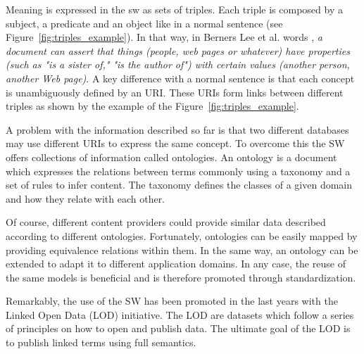 Meaning is expressed in the \acl{sw} as sets of triples.
Each triple is composed by a subject, a predicate and an object like in a normal sentence (see Figure~\ref{fig:triples_example}).
In that way, in Berners Lee et al. words \citep{berners-lee_semantic_2001}, \emph{a document can assert that things (people, web pages or whatever) have properties (such as "is a sister of," "is the author of") with certain values (another person, another Web page)}.
A key difference with a normal sentence is that each concept is unambiguously defined by an URI.
These URIs form links between different triples as shown by the example of the Figure~\ref{fig:triples_example}.




A problem with the information described so far is that two different databases may use different URIs to express the same concept.
To overcome this the SW offers collections of information called ontologies.
An ontology is a document which expresses the relations between terms commonly using a taxonomy and a set of rules to infer content.
The taxonomy defines the classes of a given domain and how they relate with each other.

Of course, different content providers could provide similar data described according to different ontologies.
Fortunately, ontologies can be easily mapped by providing equivalence relations within them.
In the same way, an ontology can be extended to adapt it to different application domains.
In any case, the reuse of the same models is beneficial and is therefore promoted through standardization.

Remarkably, the use of the SW has been promoted in the last years with the Linked Open Data (LOD) initiative.
The LOD are datasets which follow a series of principles on how to open and publish data.
The ultimate goal of the LOD is to publish linked terms using full semantics.




